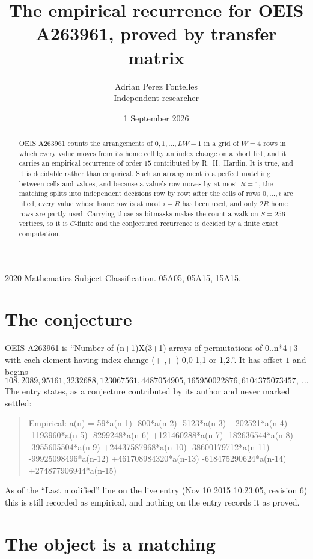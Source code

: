 \documentclass[11pt,a4paper]{article}
\title{The empirical recurrence for OEIS A263961, proved by transfer matrix}
\author{Adrian Perez Fontelles\\ \small Independent researcher}
\date{1 September 2026}
\theoremstyle{plain}
\theoremstyle{definition}
\begin{document}
\maketitle

\begin{abstract}
OEIS A263961 counts the arrangements of $0,1,\dots,LW-1$ in a grid of $W=4$ rows in which
every value moves from its home cell by an index change on a short list, and it carries an
empirical recurrence of order $15$ contributed by R.~H.~Hardin. It is true, and it is
decidable rather than empirical. Such an arrangement is a perfect matching between cells and
values, and because a value's row moves by at most $R=1$, the matching splits into
independent decisions row by row: after the cells of rows $0,\dots,i$ are filled,
every value whose home row is at most $i-R$ has been used, and only $2R$ home rows are
partly used. Carrying those as bitmasks makes the count a walk on $S=256$ vertices, so it is
$C$-finite and the conjectured recurrence is decided by a finite exact computation.
\end{abstract}

\noindent\small 2020 Mathematics Subject Classification. 05A05, 05A15, 15A15.\normalsize

\section{The conjecture}

OEIS A263961 is ``Number of (n+1)X(3+1) arrays of permutations of 0..n*4+3 with each element having index change (+-,+-) 0,0 1,1 or 1,2.''. It has offset $1$ and begins
\[
108, 2089, 95161, 3232688, 123067561, 4487054905, 165950022876, 6104375073457,\ \dots
\]
The entry states, as a conjecture contributed by its author and never marked settled:
\begin{quote}
Empirical: a(n) = 59*a(n-1) -800*a(n-2) -5123*a(n-3) +202521*a(n-4) -1193960*a(n-5) -8299248*a(n-6) +121460288*a(n-7) -182636544*a(n-8) -3955605504*a(n-9) +24437587968*a(n-10) -38600179712*a(n-11) -99925098496*a(n-12) +461708984320*a(n-13) -618475290624*a(n-14) +274877906944*a(n-15)
\end{quote}
As of the ``Last modified'' line on the live entry (Nov 10 2015 10:23:05, revision 6) this is still
recorded as empirical, and nothing on the entry records it as proved.

\section{The object is a matching}
\end{document}
